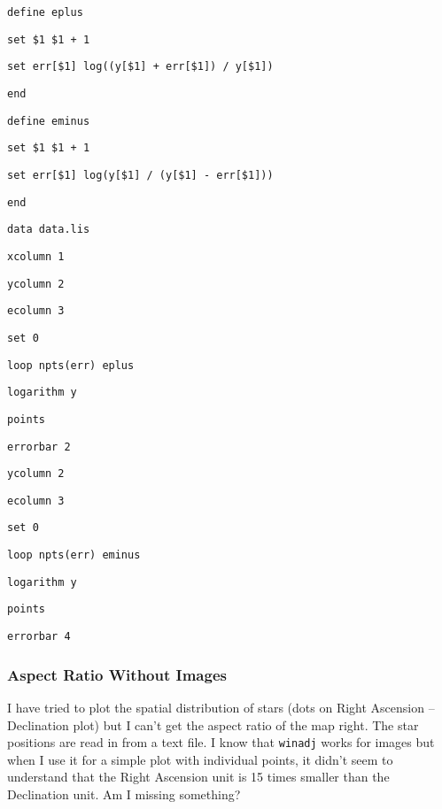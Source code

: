 \begin{wiplist}%
  \item {\tt define eplus}
  \item [\wipd] {\tt set \$1 \$1 + 1}
  \item [\wipd] {\tt set err[\$1] log((y[\$1] + err[\$1]) / y[\$1])}
  \item [\wipd] {\tt end}
  \item {\tt define eminus}
  \item [\wipd] {\tt set \$1 \$1 + 1}
  \item [\wipd] {\tt set err[\$1] log(y[\$1] / (y[\$1] - err[\$1]))}
  \item [\wipd] {\tt end}
  \item {\tt data data.lis}
  \item {\tt xcolumn 1}
  \item {\tt ycolumn 2}
  \item {\tt ecolumn 3}
  \item {\tt set  0}
  \item {\tt loop npts(err) eplus }
  \item {\tt logarithm y}
  \item {\tt points}
  \item {\tt errorbar 2}
  \item {\tt ycolumn 2}
  \item {\tt ecolumn 3}
  \item {\tt set  0}
  \item {\tt loop npts(err) eminus }
  \item {\tt logarithm y}
  \item {\tt points}
  \item {\tt errorbar 4}
\end{wiplist}

\subsubsection*         {Aspect Ratio Without Images}

I have tried to plot the spatial distribution of stars
(\ie dots on Right Ascension -- Declination plot)
but I can't get the aspect ratio of the map right.
The star positions are read in from a text file.
I know that {\tt winadj}%
works for images but when I use it for a simple plot with individual points,
it didn't seem to understand that the Right Ascension unit
is 15 times smaller than the Declination unit. 
Am I missing something?

